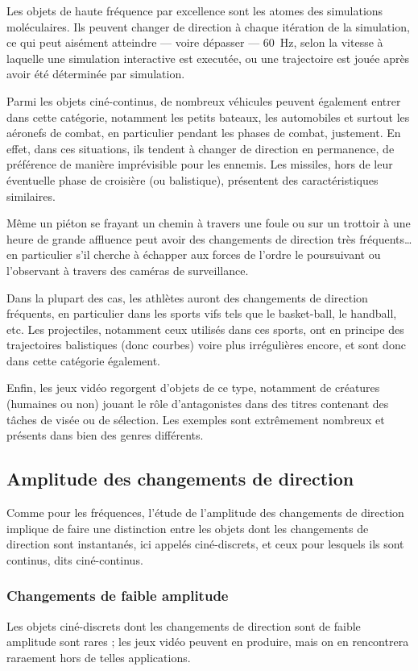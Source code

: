 	Les objets de haute fréquence par excellence sont les atomes des simulations moléculaires. Ils peuvent changer de direction à chaque itération de la simulation, ce qui peut aisément atteindre --- voire dépasser --- 60~Hz, selon la vitesse à laquelle une simulation interactive est executée, ou une trajectoire est jouée après avoir été déterminée par simulation.
	
	Parmi les objets ciné-continus, de nombreux véhicules peuvent également entrer dans cette catégorie, notamment les petits bateaux, les automobiles et surtout les aéronefs de combat, en particulier pendant les phases de combat, justement. En effet, dans ces situations, ils tendent à changer de direction en permanence, de préférence de manière imprévisible pour les ennemis. Les missiles, hors de leur éventuelle phase de croisière (ou balistique), présentent des caractéristiques similaires.
	
	Même un piéton se frayant un chemin à travers une foule ou sur un trottoir à une heure de grande affluence peut avoir des changements de direction très fréquents\ldots{} en particulier s'il cherche à échapper aux forces de l'ordre le poursuivant ou l'observant à travers des caméras de surveillance.
	
	Dans la plupart des cas, les athlètes auront des changements de direction fréquents, en particulier dans les sports \og vifs \fg{} tels que le basket-ball, le handball, etc.	Les projectiles, notamment ceux utilisés dans ces sports, ont en principe des trajectoires balistiques (donc courbes) voire plus irrégulières encore, et sont donc dans cette catégorie également.
	
	Enfin, les jeux vidéo regorgent d'objets de ce type, notamment de créatures (humaines ou non) jouant le rôle d'antagonistes dans des titres contenant des tâches de visée ou de sélection. Les exemples sont extrêmement nombreux et présents dans bien des genres différents.
	
	\subsection{Amplitude des changements de direction}
	Comme pour les fréquences, l'étude de l'amplitude des changements de direction implique de faire une distinction entre les objets dont les changements de direction sont instantanés, ici appelés ciné-discrets, et ceux pour lesquels ils sont continus, dits ciné-continus.
	
	\subsubsection{Changements de faible amplitude}
	Les objets ciné-discrets dont les changements de direction sont de faible amplitude sont rares ; les jeux vidéo peuvent en produire, mais on en rencontrera raraement hors de telles applications.
	
